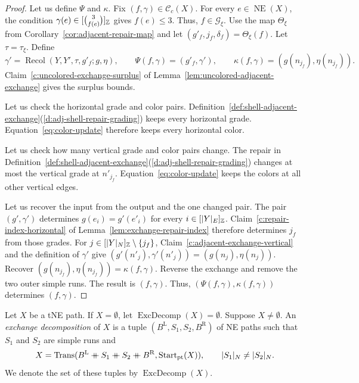 \begin{proof}
 Let us define $\Psi$ and $\kappa$.
Fix $(f,\gamma)\in\mathcal C_c(X)$.
For every $e\in\operatorname{NE}(X)$, the condition $\gamma(e)\in[\binom3{f(e)}]_{\mathbb Z}$ gives $f(e)\le3$. Thus, $f\in\mathcal G_\xi$.
Use the map $\Theta_\xi$ from Corollary~\ref{cor:adjacent-repair-map} and let $(g'_f,j_f,\delta_f)=\Theta_\xi(f)$.
Let $\tau=\tau_\xi$. Define
\[
 \gamma'=\operatorname{Recol}(Y,Y',\tau,g'_f;g,\eta),\qquad
 \Psi(f,\gamma)=(g'_f,\gamma'),\qquad
 \kappa(f,\gamma)=(g(n_{j_f}),\eta(n_{j_f})).
\]
Claim~\ref{c:uncolored-exchange-surplus} of Lemma~\ref{lem:uncolored-adjacent-exchange} gives the surplus bounds.

 Let us check the horizontal grade and color pairs.
Definition~\ref{def:shell-adjacent-exchange}(\ref{d:adj-shell-repair-grading}) keeps every horizontal grade.
Equation~\eqref{eq:color-update} therefore keeps every horizontal color.

 Let us check how many vertical grade and color pairs change.
The repair in Definition~\ref{def:shell-adjacent-exchange}(\ref{d:adj-shell-repair-grading}) changes at most the vertical grade at $n'_{j_f}$.
Equation~\eqref{eq:color-update} keeps the colors at all other vertical edges.

 Let us recover the input from the output and the one changed pair.
The pair $(g',\gamma')$ determines $g(e_i)=g'(e'_i)$ for every $i\in[|Y|_E]_{\mathbb Z}$.
Claim~\ref{c:repair-index-horizontal} of Lemma~\ref{lem:exchange-repair-index}
therefore determines $j_f$ from those grades.
For $j\in[|Y|_N]_{\mathbb Z}\setminus\{j_f\}$, Claim~\ref{c:adjacent-exchange-vertical} and the definition of $\gamma'$ give $(g'(n'_j),\gamma'(n'_j))=(g(n_j),\eta(n_j))$.
Recover $(g(n_{j_f}),\eta(n_{j_f}))=\kappa(f,\gamma)$.
Reverse the exchange and remove the two outer simple runs.
The result is $(f,\gamma)$. Thus, $(\Psi(f,\gamma),\kappa(f,\gamma))$ determines $(f,\gamma)$.
\end{proof}

\begin{definition}\label{def:exchange-decomposition}
Let $X$ be a tNE path. If $X=\emptyset$, let $\operatorname{ExcDecomp}(X)=\emptyset$.
Suppose $X\ne\emptyset$. An \textit{exchange decomposition} of $X$ is a tuple
$(B^{\mathrm L},S_1,S_2,B^{\mathrm R})$ of NE paths such that $S_1$ and $S_2$ are simple runs and
\[
 X=\operatorname{Trans}(B^{\mathrm L}\mathbin{+\mkern-10mu+} S_1\mathbin{+\mkern-10mu+} S_2\mathbin{+\mkern-10mu+} B^{\mathrm R},\operatorname{Start}_{\mathrm{pt}}(X)),\qquad
 |S_1|_N\ne|S_2|_N.
\]
We denote the set of these tuples by $\operatorname{ExcDecomp}(X)$.
\end{definition}

